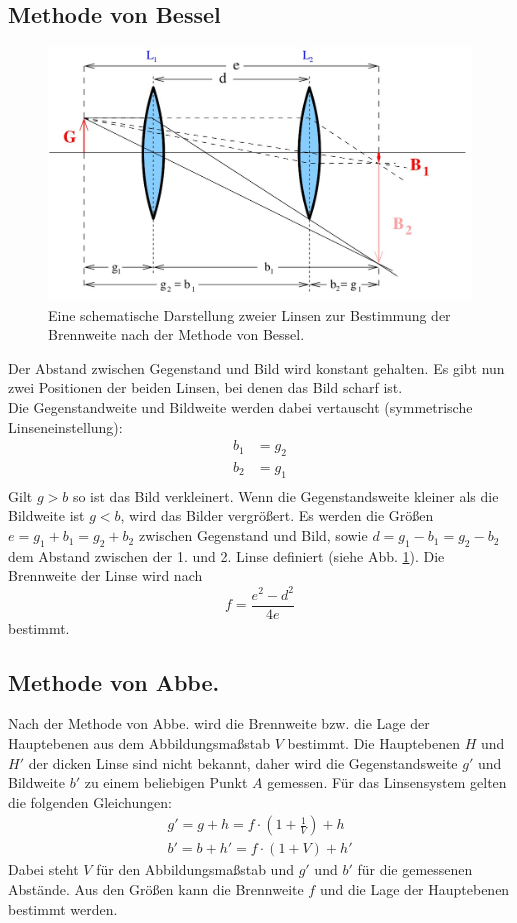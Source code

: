 \subsection{Methode von Bessel}
\begin{figure}
    \centering
    \includegraphics[width=0.9\linewidth]{content/data/bessel.jpg}
    \caption{Eine schematische Darstellung zweier Linsen zur Bestimmung der Brennweite nach der Methode von Bessel. \cite[4]{anleitung}}
    \label{fig:bessel}
\end{figure}
Der Abstand zwischen Gegenstand und Bild wird konstant gehalten.
Es gibt nun zwei Positionen der beiden Linsen, bei denen das Bild scharf ist.\\
Die Gegenstandweite und Bildweite werden dabei vertauscht (symmetrische Linseneinstellung):
\begin{align*}
    b_1 &= g_2 \\
    b_2 &= g_1 \\
\end{align*}
Gilt $g > b$ so ist das Bild verkleinert.
Wenn die Gegenstandsweite kleiner als die Bildweite ist $g < b$, wird das Bilder vergrößert.
Es werden die Größen $e = g_1 + b_1 = g_2 + b_2$ zwischen Gegenstand und Bild, sowie $d = g_1 - b_1 = g_2 - b_2$ dem Abstand zwischen der 1. und 2. Linse definiert (siehe Abb. \ref{fig:bessel}).
Die Brennweite der Linse wird nach
\begin{equation}
    f = \frac{e^2 - d^2}{4e}
    \label{eqn:bessel}
\end{equation}
bestimmt.
\FloatBarrier

\subsection{Methode von Abbe.}
Nach der Methode von Abbe. wird die Brennweite bzw. die Lage der Hauptebenen aus dem Abbildungsmaßstab $V$ bestimmt.
Die Hauptebenen $H$ und $H'$ der dicken Linse sind nicht bekannt, daher wird die Gegenstandsweite $g'$ und Bildweite $b'$ zu einem beliebigen Punkt $A$ gemessen.
Für das Linsensystem gelten die folgenden Gleichungen:
\begin{align}
    g' = g + h = f \cdot \left( 1+ \frac{1}{V} \right) + h \\
    b' = b + h' = f \cdot \left( 1 + V \right) + h'
    \label{eqn:abbe}
\end{align}
Dabei steht $V$ für den Abbildungsmaßstab und $g'$ und $b'$ für die gemessenen Abstände.
Aus den Größen kann die Brennweite $f$ und die Lage der Hauptebenen bestimmt werden.